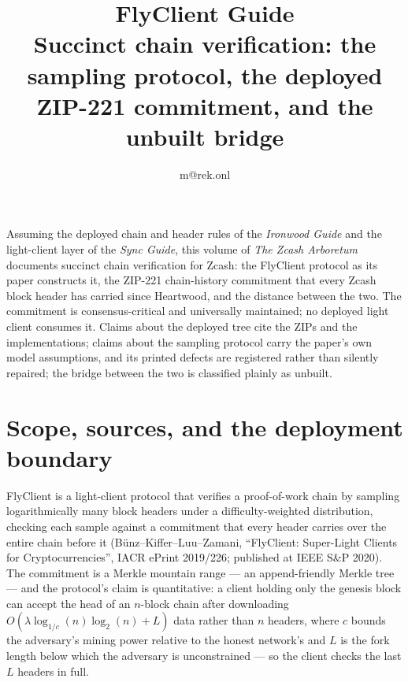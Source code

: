 \documentclass[11pt,a4paper]{article}
\title{\textbf{\Huge FlyClient Guide}\\[6pt]\large Succinct chain verification: the sampling protocol, the deployed ZIP-221 commitment, and the unbuilt bridge}
\author{m@rek.onl}
\date{}
\theoremstyle{definition}
\renewenvironment{abstract}{%
  \small\begin{center}{\bfseries\abstractname}\end{center}\medskip\noindent\ignorespaces
}{\par\medskip}
\begin{document}
\maketitle
\thispagestyle{empty}
\begin{abstract}
Assuming the deployed chain and header rules of the \emph{Ironwood Guide} and
the light-client layer of the \emph{Sync Guide}, this volume of \emph{The
Zcash Arboretum} documents succinct chain verification for Zcash: the
FlyClient protocol as its paper constructs it, the ZIP-221 chain-history
commitment that every Zcash block header has carried since Heartwood, and the
distance between the two. The commitment is consensus-critical and
universally maintained; no deployed light client consumes it. Claims about
the deployed tree cite the ZIPs and the implementations; claims about the
sampling protocol carry the paper's own model assumptions, and its printed
defects are registered rather than silently repaired; the bridge between the
two is classified plainly as unbuilt.
\end{abstract}
\clearpage
\tableofcontents
\clearpage
\section{Scope, sources, and the deployment boundary}\label{sec:fc-scope}

FlyClient is a light-client protocol that verifies a proof-of-work chain by
sampling logarithmically many block headers under a difficulty-weighted
distribution, checking each sample against a commitment that every header
carries over the entire chain before it (B\"unz--Kiffer--Luu--Zamani,
``FlyClient: Super-Light Clients for Cryptocurrencies'', IACR ePrint
2019/226; published at IEEE S\&P 2020). The commitment is a Merkle mountain
range --- an append-friendly Merkle tree --- and the protocol's claim is
quantitative: a client holding only the genesis block can accept the head of
an $n$-block chain after downloading $O(\lambda \log_{1/c}(n) \log_2(n) + L)$
data rather than $n$ headers, where $c$ bounds the adversary's mining power
relative to the honest network's and $L$ is the fork length below which the
adversary is unconstrained --- so the client checks the last $L$ headers in
full.
\end{document}
